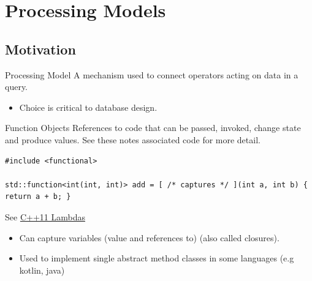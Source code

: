 \chapter{Processing Models}

\section{Motivation}
\begin{definitionbox}{Processing Model}
  A mechanism used to connect operators acting on data in a query.
  \begin{itemize}
    \item Choice is critical to database design.
  \end{itemize}
\end{definitionbox}

\begin{definitionbox}{Function Objects}
  References to code that can be passed, invoked, change state and produce values.
  See these notes associated code for more detail.
  \begin{verbatim}
#include <functional>

std::function<int(int, int)> add = [ /* captures */ ](int a, int b) { return a + b; }
    \end{verbatim}
  See \href{https://en.cppreference.com/w/cpp/language/lambda}{C++11 Lambdas}
  \begin{itemize}
    \item Can capture variables (value and references to) (also called closures).
    \item Used to implement single abstract method classes in some languages (e.g kotlin, java)
  \end{itemize}
\end{definitionbox}

